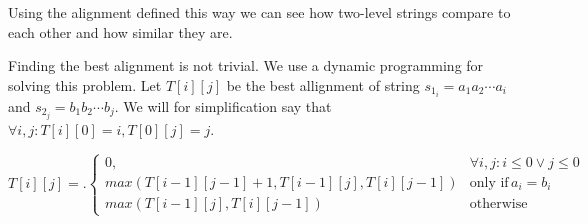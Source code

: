 Using the alignment defined this way we can see how two-level strings compare to
each other and how similar they are.

Finding the best alignment is not trivial. We use a dynamic programming for
solving this problem. Let $T[i][j]$ be the best allignment of string $s_{1_i} = a_1a_2\cdots a_i$
and $s_{2_j} = b_1b_2\cdots b_j$. We will for simplification say that $\forall i, j: T[i][0] = i, T[0][j] = j$.

\[
T[i][j] = \bigl.
  \begin{cases}
    0, & \forall i,j : i\leq 0 \lor j\leq 0 \\
    max(T[i-1][j-1] + 1, T[i-1][j], T[i][j-1]) & \text{only if} \, a_i = b_i \\ 
    max(T[i-1][j], T[i][j-1]) & \text{otherwise}
  \end{cases}
\]

